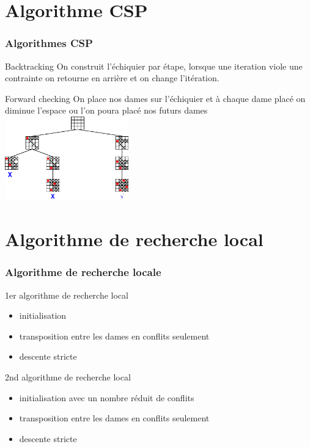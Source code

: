 \documentclass[9pt,a4paper]{beamer}
\begin{document}
\section{Algorithme CSP}
\begin{frame}
	\frametitle{Algorithmes CSP}

	\begin{block}{Backtracking}
		On construit l'échiquier par étape, lorsque une iteration viole une contrainte on retourne en arrière et on change l'itération.
	\end{block}



	\begin{block}{Forward checking}
		On place nos dames sur l'échiquier et à chaque dame placé on diminue l'espace ou l'on poura placé nos futurs dames \\
		\includegraphics[width=0.4\textwidth]{images/forw.png}
	\end{block}

\end{frame}


\section{Algorithme de recherche local}
\begin{frame}
	\frametitle{Algorithme de recherche locale}

	\begin{block}{1er algorithme de recherche local}
		\begin{itemize}
			\item{initialisation}
			\item{transposition entre les dames en conflits seulement}
			\item{descente stricte}
		\end{itemize}
	\end{block}

	\begin{block}{2nd algorithme de recherche local}
		\begin{itemize}
		      \item{initialisation avec un nombre réduit de conflits}
		      \item{transposition entre les dames en conflits seulement}
		      \item{descente stricte}
	      \end{itemize}
	\end{block}



\end{frame}
\end{document}
